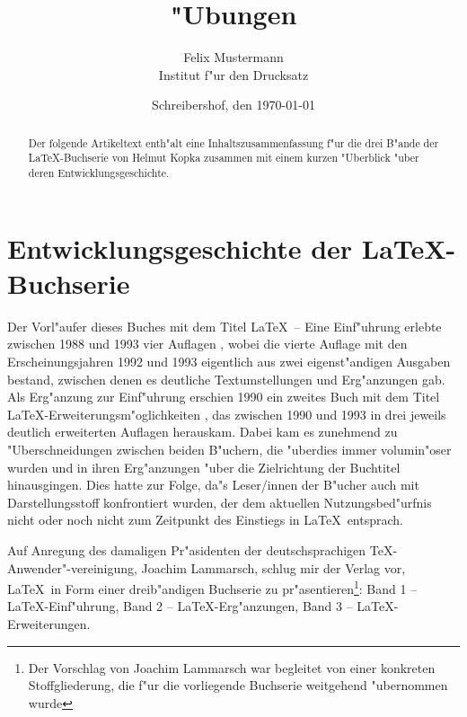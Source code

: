 \documentclass{article}
\begin{document}
\title{"Ubungen}\author{Felix Mustermann\\Institut f"ur den Drucksatz}
\date{Schreibershof, den \today} \maketitle
\begin{abstract}
Der folgende Artikeltext enth"alt eine Inhaltszusammenfassung f"ur
die drei B"ande der \LaTeX-Buchserie von Helmut Kopka zusammen mit
einem kurzen "Uberblick "uber deren Entwicklungsgeschichte.
\end{abstract}

\section{Entwicklungsgeschichte der \LaTeX-Buchserie}
Der Vorl"aufer dieses Buches mit dem Titel \LaTeX\ -- Eine Einf"uhrung
erlebte zwischen 1988 und 1993 vier Auflagen \cite{hku}, wobei die vierte
Auflage mit den Erscheinungsjahren 1992 und 1993 eigentlich aus zwei
eigenst"andigen Ausgaben bestand, zwischen denen es deutliche
Textumstellungen und Erg"anzungen gab. Als Erg"anzung zur Einf"uhrung
erschien 1990 ein zweites Buch mit dem Titel
\LaTeX-Erweiterungsm"oglichkeiten \cite{hkv}, das zwischen 1990 und 1993 in
drei jeweils deutlich erweiterten Auflagen herauskam. Dabei kam es zunehmend
zu "Uberschneidungen zwischen beiden B"uchern, die "uberdies immer 
volumin"oser wurden und in ihren Erg"anzungen "uber die Zielrichtung der
Buchtitel hinausgingen. Dies hatte zur Folge, da"s Leser/innen der B"ucher
auch mit Darstellungsstoff konfrontiert wurden, der dem aktuellen 
Nutzungsbed"urfnis nicht oder noch nicht zum Zeitpunkt des Einstiegs in 
\LaTeX\ entsprach.

Auf Anregung des damaligen Pr"asidenten der deutschsprachigen
\TeX-Anwender"-vereinigung, Joachim Lammarsch, schlug mir der Verlag vor,
\LaTeX\ in Form einer dreib"andigen Buchserie zu pr"asentieren\footnote{Der
Vorschlag von Joachim Lammarsch war begleitet von einer konkreten
Stoffgliederung, die f"ur die vorliegende Buchserie weitgehend "ubernommen
wurde}: 
Band 1 -- \LaTeX-Einf"uhrung, Band 2 -- \LaTeX-Erg"anzungen, Band 3 --
\LaTeX-Erweiterungen. \cite{hk}
\end{document}
